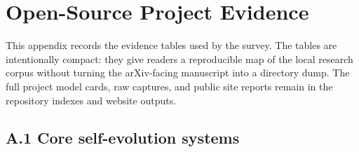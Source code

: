 
\section{Open-Source Project Evidence}
\label{app:projects}

This appendix records the evidence tables used by the survey. The tables are intentionally compact: they give readers a reproducible map of the local research corpus without turning the arXiv-facing manuscript into a directory dump. The full project model cards, raw captures, and public site reports remain in the repository indexes and website outputs.

\subsection*{A.1 Core self-evolution systems}

